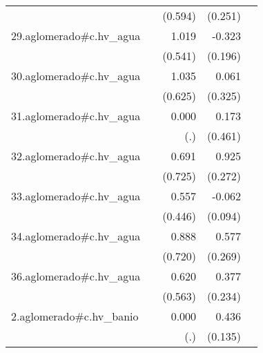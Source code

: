 {\begin{longtable}{l*{4}{D{.}{.}{-1}}}
            &                     &     (0.594)         &     (0.251)         &                     \\
\addlinespace
29.aglomerado#c.hv\_agua&                     &       1.019         &      -0.323         &                     \\
            &                     &     (0.541)         &     (0.196)         &                     \\
\addlinespace
30.aglomerado#c.hv\_agua&                     &       1.035         &       0.061         &                     \\
            &                     &     (0.625)         &     (0.325)         &                     \\
\addlinespace
31.aglomerado#c.hv\_agua&                     &       0.000         &       0.173         &                     \\
            &                     &         (.)         &     (0.461)         &                     \\
\addlinespace
32.aglomerado#c.hv\_agua&                     &       0.691         &       0.925\sym{***}&                     \\
            &                     &     (0.725)         &     (0.272)         &                     \\
\addlinespace
33.aglomerado#c.hv\_agua&                     &       0.557         &      -0.062         &                     \\
            &                     &     (0.446)         &     (0.094)         &                     \\
\addlinespace
34.aglomerado#c.hv\_agua&                     &       0.888         &       0.577\sym{*}  &                     \\
            &                     &     (0.720)         &     (0.269)         &                     \\
\addlinespace
36.aglomerado#c.hv\_agua&                     &       0.620         &       0.377         &                     \\
            &                     &     (0.563)         &     (0.234)         &                     \\
\addlinespace
2.aglomerado#c.hv\_banio&                     &       0.000         &       0.436\sym{**} &                     \\
            &                     &         (.)         &     (0.135)         &                     \\

\end{longtable}}
